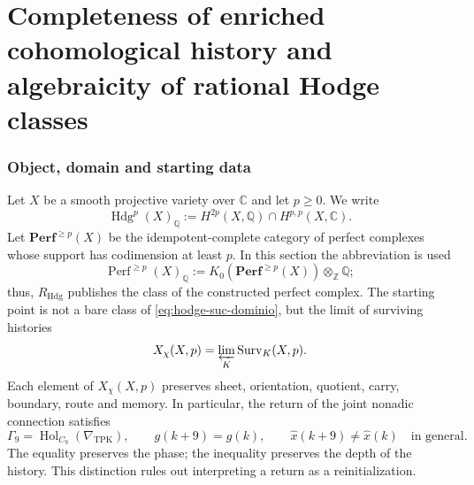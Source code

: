 %

\ifdefined\HMTSucesoraStructureTrace
\fi

\chapter{Completeness of enriched cohomological history and algebraicity of rational Hodge classes}

\subsection*{Object, domain and starting data}

Let \(X\) be a smooth projective variety over \(\mathbb C\) and let
\(p\geq0\). We write
\begin{equation}\label{eq:hodge-suc-dominio}
 \operatorname{Hdg}^{p}(X)_{\mathbb Q}
 :=H^{2p}(X,\mathbb Q)
   \cap H^{p,p}(X,\mathbb C).
\end{equation}
Let \(\mathbf{Perf}^{\geq p}(X)\) be the idempotent-complete category of
perfect complexes whose support has codimension at least \(p\). In this
section the abbreviation is used
\[
 \operatorname{Perf}^{\geq p}(X)_{\mathbb Q}
 :=K_0\!\left(\mathbf{Perf}^{\geq p}(X)\right)
   \otimes_{\mathbb Z}\mathbb Q;
\]
thus, \(R_{\mathrm{Hdg}}\) publishes the class of the constructed perfect
complex. The starting point is not a bare class of
\eqref{eq:hodge-suc-dominio}, but the limit of surviving histories
\begin{equation}\label{eq:hodge-suc-xchi}
 X_{\chi}(X,p)
 =\varprojlim_{K}\operatorname{Surv}_{K}(X,p).
\end{equation}
Each element of \(X_{\chi}(X,p)\) preserves sheet, orientation, quotient,
carry, boundary, route and memory. In particular, the return of the joint
nonadic connection satisfies
\begin{equation}\label{eq:hodge-suc-retorno}
 \Gamma _9=\operatorname{Hol}_{C_9}(\nabla_{\mathrm{TPK}}),
 \qquad g(k+9)=g(k),
 \qquad \widehat x(k+9)\neq\widehat x(k)
 \quad\text{in general}.
\end{equation}
The equality preserves the phase; the inequality preserves the depth of the
history. This distinction rules out interpreting a return as a
reinitialization.

